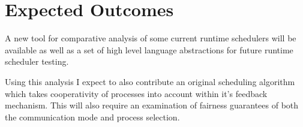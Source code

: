 \documentclass[11pt]{artikel3}
\begin{document}
\section{Expected Outcomes}

A new tool for comparative analysis of some current runtime schedulers will be available as well as a 
set of high level language abstractions for future runtime scheduler testing.

Using this analysis I expect to also contribute an original scheduling algorithm which takes cooperativity 
of processes into account within it's feedback mechanism. This will also require an examination of fairness 
guarantees of both the communication mode and process selection.


\nocite{*}


\end{document}
